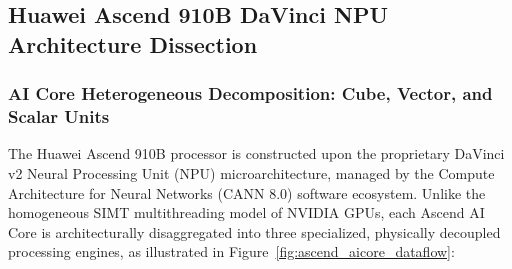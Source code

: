 \subsection{Huawei Ascend 910B DaVinci NPU Architecture Dissection}
\label{sec:appendix_ascend_dissection}

\subsubsection{AI Core Heterogeneous Decomposition: Cube, Vector, and Scalar Units}
\label{sec:appendix_ascend_ai_core}

The Huawei Ascend 910B processor is constructed upon the proprietary DaVinci v2 Neural Processing Unit (NPU) microarchitecture, managed by the Compute Architecture for Neural Networks (CANN 8.0) software ecosystem. Unlike the homogeneous SIMT multithreading model of NVIDIA GPUs, each Ascend AI Core is architecturally disaggregated into three specialized, physically decoupled processing engines, as illustrated in Figure~\ref{fig:ascend_aicore_dataflow}:
